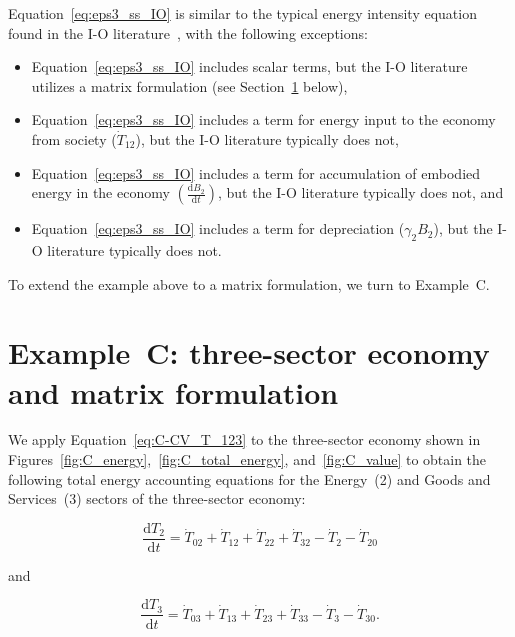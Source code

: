 Equation~\ref{eq:eps3_ss_IO} is similar 
to the typical energy intensity equation 
found in the I-O literature~\cite[Equation 6]{Casler1984},
with the following exceptions:

\begin{itemize}
	\item{Equation~\ref{eq:eps3_ss_IO} includes scalar terms, 
	but the I-O literature utilizes a matrix
	formulation (see Section~\ref{sec:C-intensity_and_matrix} below),}
	\item{Equation~\ref{eq:eps3_ss_IO} includes a term for 
	energy input to the economy from society ($\dot{T}_{12}$), 
	but the I-O literature typically does not,}
	\item{Equation~\ref{eq:eps3_ss_IO} includes a term for
	accumulation of embodied energy in the economy 
	$\left( \frac{\mathrm{d}B_{2}}{\mathrm{d}t} \right)$,
	but the I-O literature typically does not, and}
	\item{Equation~\ref{eq:eps3_ss_IO} includes a term for
	depreciation ($\gamma_{2}B_{2}$),
	but the I-O literature typically does not.}
\end{itemize}

To extend the example above to a matrix formulation,
we turn to Example~C.


\section{Example~C: three-sector economy and matrix formulation} %
\label{sec:C-intensity_and_matrix}

We apply Equation~\ref{eq:C-CV_T_123} to the three-sector
economy shown in 
Figures~\ref{fig:C_energy},~\ref{fig:C_total_energy}, and~\ref{fig:C_value}
to obtain the following total energy accounting equations
for the Energy~(2) and Goods and Services~(3) sectors 
of the three-sector economy:

\begin{equation} \label{eq:C-Total_Energy_Sec_2-a}
	\frac{\mathrm{d}T_{2}}{\mathrm{d}t} 
	= \dot{T}_{02}  
	+ \dot{T}_{12}
	+ \dot{T}_{22}
	+ \dot{T}_{32}
	- \dot{T}_{2}
	- \dot{T}_{20}
\end{equation}

\noindent{}and

\begin{equation} \label{eq:C-Total_Energy_Sec_3-a}
	\frac{\mathrm{d}T_{3}}{\mathrm{d}t} 
	= \dot{T}_{03}  
	+ \dot{T}_{13}
	+ \dot{T}_{23}
	+ \dot{T}_{33}
	- \dot{T}_{3}
	- \dot{T}_{30}.
\end{equation}

